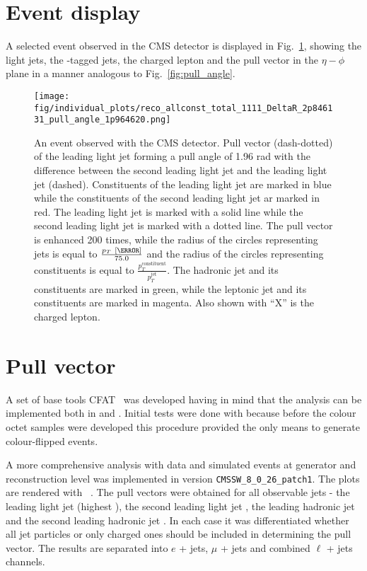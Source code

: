 \label{chap:results}
\section{Event display}
A selected event observed in the CMS detector is displayed in Fig.~\ref{fig:event_display}, showing the light jets, the \cPqb-tagged jets, the charged lepton and the pull vector in the $\eta-\phi$ plane in a manner analogous to Fig.~\ref{fig:pull_angle}.

\begin{figure}[hbtp]
  \centering
  \texttt{[image: fig/individual\_plots/reco\_allconst\_total\_1111\_DeltaR\_2p846131\_pull\_angle\_1p964620.png]}
  \caption{An event observed with the CMS detector. Pull vector (dash-dotted) of the leading light jet forming a pull angle of 1.96 rad with the difference between the second leading light jet and the leading light jet (dashed). Constituents of the leading light jet are marked in blue while the constituents of the second leading light jet ar marked in red. The leading light jet is marked with a solid line while the second leading light jet is marked with a dotted line. The pull vector is enhanced 200 times, while the radius of the circles representing jets is equal to $\frac{p_{T}~[\GeV]}{75.0}$ and the radius of the circles representing constituents is equal to $\frac{p^{\text{constituent}}_{T}}{p^{\text{jet}}_{T}}$. The hadronic \cPqb jet and its constituents are marked in green, while the leptonic \cPqb jet and its constituents are marked in magenta. Also shown with ``X'' is the charged lepton.}
  \label{fig:event_display}
\end{figure}

\section{Pull vector}

A set of base tools \textsc{CFAT}~\cite{url:cfat} was developed having in mind that the analysis can be implemented both in \RIVET and \CMSSW. Initial tests were done with \RIVET because before the colour octet \PW samples were developed this procedure provided the only means to generate colour-flipped events.

A more comprehensive analysis with data and simulated events at generator and reconstruction level was implemented in \CMSSW version \lstinline[language=sh]|CMSSW_8_0_26_patch1|. The plots are rendered with \ROOT~\cite{Brun}. The pull vectors were obtained for all observable jets - the leading light jet \leadingjet (highest \pt), the second leading light jet \scndleadingjet, the leading hadronic \cPqb jet \leadingb and the second leading hadronic \cPqb jet \scndleadingb. In each case it was differentiated whether all jet particles or only charged ones should be included in determining the pull vector. The results are separated into $e$ + jets, $\mu$ + jets and combined $\ell$ + jets channels.

